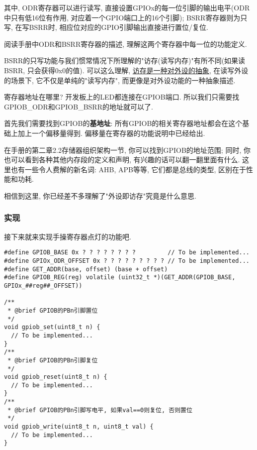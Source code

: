 其中, ODR寄存器可以进行读写, 直接设置GPIOx的每一位引脚的输出电平(ODR中只有低16位有作用, 对应着一个GPIO端口上的16个引脚); BSRR寄存器则为只写, 在写BSRR时, 相应位对应的GPIO引脚输出直接进行置位/复位.

\begin{theorem}
	阅读手册中ODR和BSRR寄存器的描述, 理解这两个寄存器中每一位的功能定义.
\end{theorem}
\begin{definition}
	BSRR的只写功能与我们惯常情况下所理解的"访存(读写内存)"有所不同(如果读BSRR, 只会获得0x0的值). 可以这么理解, \underline{访存是一种对外设的抽象}, 在读写外设的场景下, 它不仅是单纯的"读写内存", 而更像是对外设功能的一种抽象描述.
\end{definition}
\begin{definition}{寄存器地址在哪里?}
	开发板上的LED都连接在GPIOB端口. 所以我们只需要找GPIOB\_ODR和GPIOB\_BSRR的地址就可以了.

	首先我们需要找到GPIOB的\textbf{基地址}: 所有GPIOB的相关寄存器地址都会在这个基础上加上一个偏移量得到. 偏移量在寄存器的功能说明中已经给出.
\end{definition}

在手册的第二章2.2存储器组织架构一节, 你可以找到GPIOB的地址范围; 同时, 你也可以看到各种其他内存段的定义和声明, 有兴趣的话可以翻一翻里面有什么. 这里也有一些令人费解的新名词: AHB, APB等等, 它们都是总线的类型, 区别在于性能和功耗.

相信到这里, 你已经差不多理解了"外设即访存"究竟是什么意思.

\subsubsection{实现}
接下来就来实现手操寄存器点灯的功能吧.

\begin{lstlisting}
#define GPIOB_BASE 0x ? ? ? ? ? ? ? ?         // To be implemented...
#define GPIOx_ODR_OFFSET 0x ? ? ? ? ? ? ? ? ? // To be implemented...
#define GET_ADDR(base, offset) (base + offset)
#define GPIOB_REG(reg) volatile (uint32_t *)(GET_ADDR(GPIOB_BASE, GPIOx_##reg##_OFFSET))

/**
 * @brief GPIOB的PBn引脚置位
 */
void gpiob_set(uint8_t n) {
  // To be implemented...
}
/**
 * @brief GPIOB的PBn引脚复位
 */
void gpiob_reset(uint8_t n) {
  // To be implemented...
}
/**
 * @brief GPIOB的PBn引脚写电平, 如果val==0则复位, 否则置位
 */
void gpiob_write(uint8_t n, uint8_t val) {
  // To be implemented...
}
\end{lstlisting}

